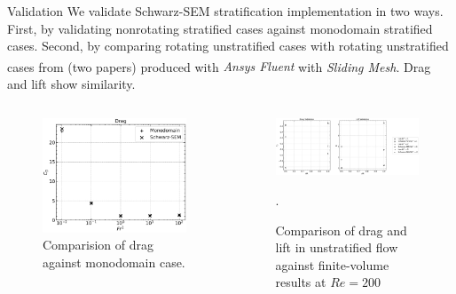 \documentclass[aspectratio=169,xcolor=dvipsnames]{beamer}
\newcommand\Rey{\mathit{Re}}
\begin{document}
\begin{frame}{Validation}
    We validate Schwarz-SEM stratification implementation in two ways.
    First, by validating nonrotating stratified cases against monodomain stratified cases. 
    Second, by comparing rotating unstratified cases with rotating unstratified cases from \cite{lu2018flow} (two papers) produced with \textit{Ansys\textsuperscript{\textregistered} Fluent} with \textit{Sliding Mesh}. 
    Drag and lift show similarity.  
    \begin{columns}[c]
        \begin{figure}
            \includegraphics[width=\textwidth]{figures/dragvalnn.pdf}
            \caption{Comparision of drag against monodomain case.}
        \end{figure}
        \begin{figure}
            \includegraphics[width=\textwidth]{figures/lua_com.pdf}
            \caption{Comparison of drag and lift in unstratified flow against \cite{lu2018flow} finite-volume results at $\Rey = 200$}.
        \end{figure}
    \end{columns}
    
\end{frame}
\end{document}
